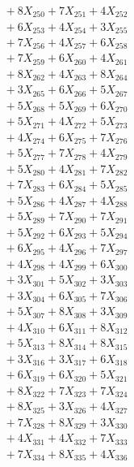 \documentclass[a4paper,10pt]{article}
\begin{document}
{\begin{align}
&\;  + 8 X_{250} + 7 X_{251} + 4 X_{252} \\[0.3ex]
&\;  + 6 X_{253} + 4 X_{254} + 3 X_{255} \\[0.3ex]
&\;  + 7 X_{256} + 4 X_{257} + 6 X_{258} \\[0.3ex]
&\;  + 7 X_{259} + 6 X_{260} + 4 X_{261} \\[0.3ex]
&\;  + 8 X_{262} + 4 X_{263} + 8 X_{264} \\[0.3ex]
&\;  + 3 X_{265} + 6 X_{266} + 5 X_{267} \\[0.3ex]
&\;  + 5 X_{268} + 5 X_{269} + 6 X_{270} \\[0.3ex]
&\;  + 5 X_{271} + 4 X_{272} + 5 X_{273} \\[0.3ex]
&\;  + 4 X_{274} + 6 X_{275} + 7 X_{276} \\[0.3ex]
&\;  + 5 X_{277} + 7 X_{278} + 4 X_{279} \\[0.5ex]\allowbreak
&\;  + 5 X_{280} + 4 X_{281} + 7 X_{282} \\[0.3ex]
&\;  + 7 X_{283} + 6 X_{284} + 5 X_{285} \\[0.3ex]
&\;  + 5 X_{286} + 4 X_{287} + 4 X_{288} \\[0.3ex]
&\;  + 5 X_{289} + 7 X_{290} + 7 X_{291} \\[0.3ex]
&\;  + 5 X_{292} + 6 X_{293} + 5 X_{294} \\[0.3ex]
&\;  + 6 X_{295} + 4 X_{296} + 7 X_{297} \\[0.3ex]
&\;  + 4 X_{298} + 4 X_{299} + 6 X_{300} \\[0.3ex]
&\;  + 3 X_{301} + 5 X_{302} + 3 X_{303} \\[0.3ex]
&\;  + 3 X_{304} + 6 X_{305} + 7 X_{306} \\[0.3ex]
&\;  + 5 X_{307} + 8 X_{308} + 3 X_{309} \\[0.5ex]\allowbreak
&\;  + 4 X_{310} + 6 X_{311} + 8 X_{312} \\[0.3ex]
&\;  + 5 X_{313} + 8 X_{314} + 8 X_{315} \\[0.3ex]
&\;  + 3 X_{316} + 3 X_{317} + 6 X_{318} \\[0.3ex]
&\;  + 6 X_{319} + 6 X_{320} + 5 X_{321} \\[0.3ex]
&\;  + 8 X_{322} + 7 X_{323} + 7 X_{324} \\[0.3ex]
&\;  + 8 X_{325} + 3 X_{326} + 4 X_{327} \\[0.3ex]
&\;  + 7 X_{328} + 8 X_{329} + 3 X_{330} \\[0.3ex]
&\;  + 4 X_{331} + 4 X_{332} + 7 X_{333} \\[0.3ex]
&\;  + 7 X_{334} + 8 X_{335} + 4 X_{336} \\[0.3ex]

\end{align}}
\end{document}
